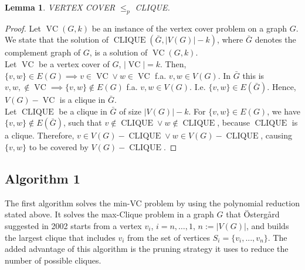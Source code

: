 \documentclass[11pt,a4paper]{article}
\newtheorem*{lemma}{Lemma}
\DeclareMathOperator{\VC}{VC}
\DeclareMathOperator{\CLIQUE}{CLIQUE}
\begin{document}
\begin{lemma}
VERTEX COVER $\leq_{p}$ CLIQUE.
\end{lemma}

\begin{proof}
Let $\VC(G, k)$ be an instance of the vertex cover problem on a graph $G$. We state that the solution of $\CLIQUE(\bar G, |V(G)|-k)$, where $\bar G$ denotes the complement graph of $G$, is a solution of $\VC(G, k)$. \\

Let $\VC$ be a vertex cover of $G$, $|\VC| = k$. Then, $\{v,w\} \in E(G) \implies v \in \VC \lor w \in \VC$ f.a. $v,w \in V(G)$. In $\bar G$ this is $v,w, \not \in \VC \implies \{v,w\} \not \in E(G)$ f.a. $v,w \in V(G)$. I.e. $\{v,w\} \in E(\bar G)$. Hence, $V(G) - \VC$ is a clique in $\bar G$. \\

Let $\CLIQUE$ be a clique in $\bar G$ of size $|V(G)|-k$. For $\{v,w\} \in E(G)$, we have $\{v,w\} \not \in E(\bar G)$, such that $v \not \in \CLIQUE \lor w \not \in \CLIQUE$, because $\CLIQUE$ is a clique. Therefore, $v \in V(G) - \CLIQUE \lor w \in V(G) - \CLIQUE$, causing $\{v,w\}$ to be covered by $V(G) - \CLIQUE$.
\end{proof}

\subsection{Algorithm 1}
The first algorithm solves the min-VC problem by using the polynomial reduction stated above. It solves the max-Clique problem in a graph $G$ that Östergård suggested in 2002 starts from a vertex $v_i$, $i=n, \dots, 1$, $n :=|V(G)|$, and builds the largest clique that includes $v_i$ from the set of vertices $S_i = \{v_i, ..., v_n\}$. The added advantage of this algorithm is the pruning strategy it uses to reduce the number of possible cliques.
\end{document}
